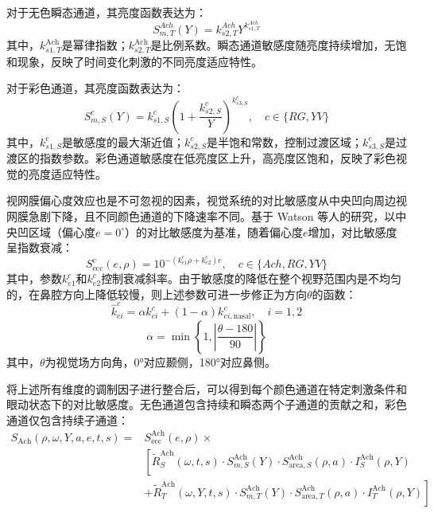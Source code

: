 对于无色瞬态通道，其亮度函数表达为\cite{1-2-9}：
\begin{equation}
S_{m,T}^{Ach}(Y) = k_{s2,T}^{Ach} Y^{k_{s1,T}^{Ach}}
\label{eq:ach_luminance_transient}
\end{equation}
其中，\(k_{s1,T}^{\text{Ach}}\)是幂律指数；\(k_{s2,T}^{\text{Ach}}\)是比例系数。瞬态通道敏感度随亮度持续增加，无饱和现象，反映了时间变化刺激的不同亮度适应特性。


对于彩色通道，其亮度函数表达为\cite{1-2-9}：
\begin{equation}
S_{m,S}^{c}(Y) = k_{s1,S}^{c} \left(1 + \frac{k_{s2,S}^{c}}{Y}\right)^{k_{s3,S}^{c}}, \quad c \in \{RG, YV\}
\label{eq:color_luminance}
\end{equation}
其中，\(k_{s1,S}^{c}\)是敏感度的最大渐近值；\(k_{s2,S}^{c}\)是半饱和常数，控制过渡区域；\(k_{s3,S}^{c}\)是过渡区的指数参数。彩色通道敏感度在低亮度区上升，高亮度区饱和，反映了彩色视觉的亮度适应特性。

视网膜偏心度效应也是不可忽视的因素，视觉系统的对比敏感度从中央凹向周边视网膜急剧下降，且不同颜色通道的下降速率不同。基于 Watson 等人的研究，以中央凹区域（偏心度\(e = 0^\circ\)）的对比敏感度为基准，随着偏心度\(e\)增加，对比敏感度呈指数衰减\cite{3-2-9}：
\begin{equation}
S_{\text{ecc}}^{c}(e, \rho) = 10^{-(k_{e1}^{c} \rho + k_{e2}^{c}) e},\quad c \in \{Ach,RG, YV\}
\label{eq:eccentricity_basic}
\end{equation}
其中，参数\(k_{e1}^{c}\)和\(k_{e2}^{c}\)控制衰减斜率。由于敏感度的降低在整个视野范围内是不均匀的，在鼻腔方向上降低较慢，则上述参数可进一步修正为方向\(\theta\)的函数\cite{1-2-9}：
\begin{equation}
\widehat{k}_{ei}^{c} = \alpha k_{ei}^{c} + (1 - \alpha)k_{ei,\text{nasal}}^{c}, \quad i = 1,2
\label{eq:eccentricity_weighted}
\end{equation}
\begin{equation}
\alpha = \min\left\{1, \left|\frac{\theta - 180}{90}\right|\right\}
\label{eq:eccentricity_alpha}
\end{equation}
其中，\(\theta\)为视觉场方向角，0°对应颞侧，180°对应鼻侧。

将上述所有维度的调制因子进行整合后，可以得到每个颜色通道在特定刺激条件和眼动状态下的对比敏感度。无色通道包含持续和瞬态两个子通道的贡献之和，彩色通道仅包含持续子通道：
\begin{equation}
\begin{aligned}
S_{\text{Ach}}(\rho, \omega, Y, a, e, t, s) = & S_{\text{ecc}}^{\text{Ach}}(e, \rho) \times \\
& \left[ \tilde{R}_S^{\text{Ach}}(\omega, t, s) \cdot S_{m,S}^{\text{Ach}}(Y) \cdot S_{\text{area},S}^{\text{Ach}}(\rho, a) \cdot I_S^{\text{Ach}}(\rho, Y) \right. \\
& + \left. \tilde{R}_T^{\text{Ach}}(\omega, Y, t, s) \cdot S_{m,T}^{\text{Ach}}(Y) \cdot S_{\text{area},T}^{\text{Ach}}(\rho, a) \cdot I_T^{\text{Ach}}(\rho, Y) \right]
\end{aligned}
\label{eq:ach_sensitivity}
\end{equation}

